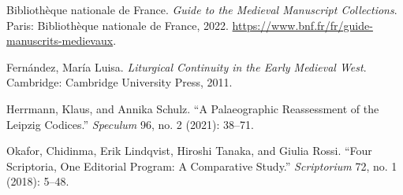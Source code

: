 \hypertarget{refs}{}
\begin{CSLReferences}{1}{0}
\leavevmode{}%
Bibliothèque nationale de France. \emph{Guide to the Medieval Manuscript
Collections}. Paris: Bibliothèque nationale de France, 2022.
\url{https://www.bnf.fr/fr/guide-manuscrits-medievaux}.

\leavevmode{}%
Fernández, María Luisa. \emph{Liturgical Continuity in the Early
Medieval West}. Cambridge: Cambridge University Press, 2011.

\leavevmode{}%
Herrmann, Klaus, and Annika Schulz. {``A Palaeographic Reassessment of
the Leipzig Codices.''} \emph{Speculum} 96, no. 2 (2021): 38--71.

\leavevmode{}%
Okafor, Chidinma, Erik Lindqvist, Hiroshi Tanaka, and Giulia Rossi.
{``Four Scriptoria, One Editorial Program: A Comparative Study.''}
\emph{Scriptorium} 72, no. 1 (2018): 5--48.

\end{CSLReferences}

